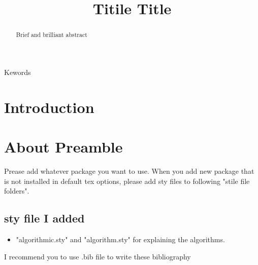 \documentclass[english]{ieej-e-samcon}
\title{Titile Title}
\begin{document}
\begin{abstract}
Brief and brilliant abstract
\end{abstract}
\begin{keyword}
Kewords
\end{keyword}
\maketitle

\section{Introduction}

\section{About Preamble}
Prease add whatever package you want to use.
When you add new package that is not installed in default tex options, please add sty files to following "stile file folders".
\subsection{sty file  I added}
\begin{itemize}
	\item "algorithmic.sty" and "algorithm.sty" for explaining the algorithms.
\end{itemize}

\begin{thebibliography}{99}
\item{} I recommend you to use .bib file to write these bibliography
\end{thebibliography}
\end{document}
